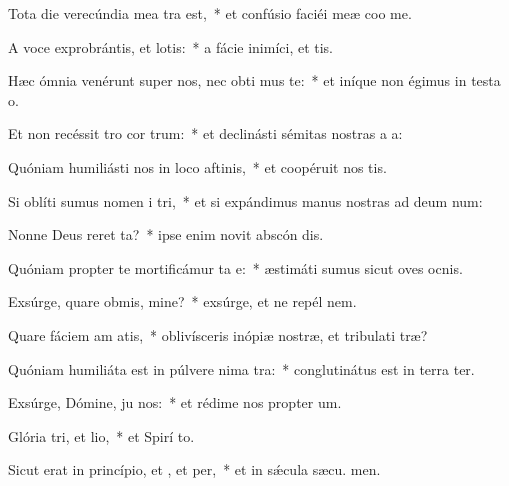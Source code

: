\item Tota die verecúndia mea tra  est,~* et confúsio faciéi meæ coo me.
\item A voce exprobrántis, et lotis:~* a fácie inimíci, et tis.
\item Hæc ómnia venérunt super nos, nec obti mus te:~* et iníque non égimus in testa o.
\item Et non recéssit tro cor trum:~* et declinásti sémitas nostras a  a:
\item Quóniam humiliásti nos in loco aftinis,~* et coopéruit nos  tis.
\item Si oblíti sumus nomen i tri,~* et si expándimus manus nostras ad deum num:
\item Nonne Deus reret ta?~* ipse enim novit abscón dis.
\item Quóniam propter te mortificámur ta e:~* æstimáti sumus sicut oves ocnis.
\item Exsúrge, quare obmis, mine?~* exsúrge, et ne repél  nem.
\item Quare fáciem am atis,~* oblivísceris inópiæ nostræ, et tribulati træ?
\item Quóniam humiliáta est in púlvere nima tra:~* conglutinátus est in terra  ter.
\item Exsúrge, Dómine, ju nos:~* et rédime nos propter  um.
\item Glória tri, et lio,~* et Spirí to.
\item Sicut erat in princípio, et , et per,~* et in sǽcula sæcu. men.
